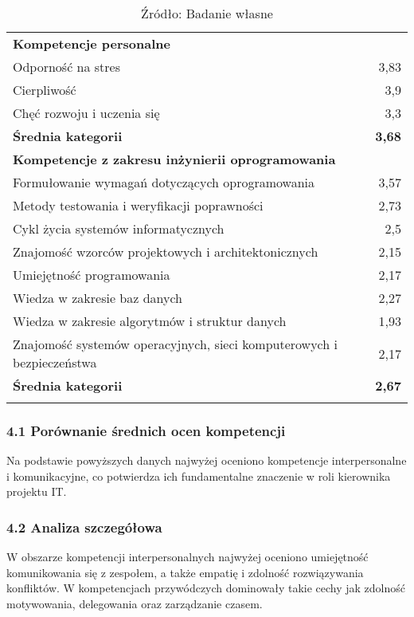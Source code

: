 \begin{longtable}{p{10cm} r}
  \midrule
  \multicolumn{2}{l}{\textbf{Kompetencje personalne}} \\
  Odporność na stres & 3{,}83 \\
  Cierpliwość & 3{,}9 \\
  Chęć rozwoju i uczenia się & 3{,}3 \\
  \textbf{Średnia kategorii} & \textbf{3{,}68} \\
  \midrule
  \multicolumn{2}{l}{\textbf{Kompetencje z zakresu inżynierii oprogramowania}} \\
  Formułowanie wymagań dotyczących oprogramowania & 3{,}57 \\
  Metody testowania i weryfikacji poprawności & 2{,}73 \\
  Cykl życia systemów informatycznych & 2{,}5 \\
  Znajomość wzorców projektowych i architektonicznych & 2{,}15 \\
  Umiejętność programowania & 2{,}17 \\
  Wiedza w zakresie baz danych & 2{,}27 \\
  Wiedza w zakresie algorytmów i struktur danych & 1{,}93 \\
  Znajomość systemów operacyjnych, sieci komputerowych i bezpieczeństwa & 2{,}17 \\
  \textbf{Średnia kategorii} & \textbf{2{,}67} \\
  \bottomrule
  \caption*{Źródło: Badanie własne}
  \end{longtable}

\subsubsection*{4.1 Porównanie średnich ocen kompetencji}

Na podstawie powyższych danych najwyżej oceniono kompetencje interpersonalne i komunikacyjne, co potwierdza ich fundamentalne znaczenie w roli kierownika projektu IT.



\subsubsection*{4.2 Analiza szczegółowa}

W obszarze kompetencji interpersonalnych najwyżej oceniono umiejętność komunikowania się z zespołem, a także empatię i zdolność rozwiązywania konfliktów. W kompetencjach przywódczych dominowały takie cechy jak zdolność motywowania, delegowania oraz zarządzanie czasem.

